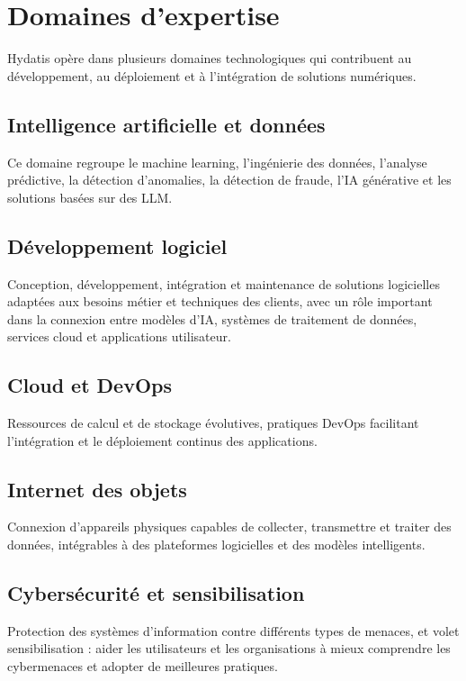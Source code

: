 \documentclass[12pt,a4paper]{report}
\begin{document}
\section{Domaines d'expertise}

Hydatis opère dans plusieurs domaines technologiques qui contribuent au développement, au déploiement et à l'intégration de solutions numériques.

\subsection{Intelligence artificielle et données}

Ce domaine regroupe le machine learning, l'ingénierie des données, l'analyse prédictive, la détection d'anomalies, la détection de fraude, l'IA générative et les solutions basées sur des LLM.

\subsection{Développement logiciel}

Conception, développement, intégration et maintenance de solutions logicielles adaptées aux besoins métier et techniques des clients, avec un rôle important dans la connexion entre modèles d'IA, systèmes de traitement de données, services cloud et applications utilisateur.

\subsection{Cloud et DevOps}

Ressources de calcul et de stockage évolutives, pratiques DevOps facilitant l'intégration et le déploiement continus des applications.

\subsection{Internet des objets}

Connexion d'appareils physiques capables de collecter, transmettre et traiter des données, intégrables à des plateformes logicielles et des modèles intelligents.

\subsection{Cybersécurité et sensibilisation}

Protection des systèmes d'information contre différents types de menaces, et volet sensibilisation : aider les utilisateurs et les organisations à mieux comprendre les cybermenaces et adopter de meilleures pratiques.
\end{document}
